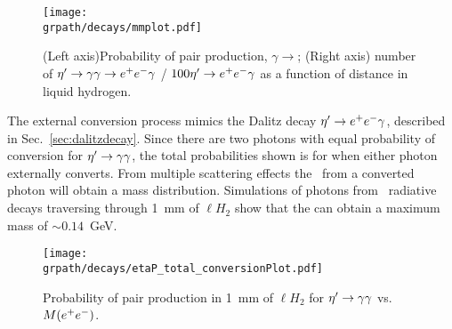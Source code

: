 \begin{figure}[h!]\begin{center}
	\texttt{[image: \\grpath/decays/mmplot.pdf]}
	\caption[Probability of pair production, $\gamma \to$\epemT, as a function of distance in liquid hydrogen]{\label{fig:conversionmm}{(Left axis)Probability of pair production, $\gamma \to$\epemT; (Right axis) number of $\eta^{\prime} \to \gamma \gamma \rightarrow e^+e^- \gamma$ / $100 \eta^{\prime} \rightarrow e^+e^- \gamma$ as a function of distance in liquid hydrogen.}}
\end{center}\end{figure}
The external conversion process mimics the Dalitz decay  $\eta^{\prime} \to e^+e^- \gamma$, described in Sec.~\ref{sec:dalitzdecay}. Since there are two photons with equal probability of conversion for $\eta^{\prime} \to \gamma \gamma$, the total probabilities shown is for when either photon externally converts.
From multiple scattering effects the \epemT \ from a converted photon will obtain a mass distribution. Simulations of photons from \etaTP \ radiative decays traversing through 1~mm of $\ell H_2$  show that the \epemT can obtain a maximum mass of $\sim 0.14$~GeV.		
\begin{figure}[h!]\begin{center}
		\texttt{[image: \\grpath/decays/etaP\_total\_conversionPlot.pdf]}
		\caption[Probability of pair production, $\gamma \to$\epemT, as a function of $M(\epem)$]{\label{fig:conversion_inM}{Probability of pair production in 1~mm of  $\ell H_2$ for $\eta^{\prime} \to \gamma \gamma $ vs. $M(\epem)$.}}
\end{center}\end{figure}
\FloatBarrier
